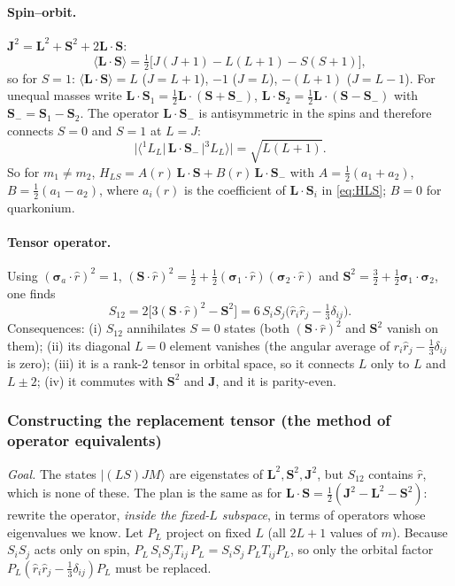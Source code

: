 \documentclass[11pt,a4paper]{article}
\numberwithin{equation}{section}
\theoremstyle{definition}
\theoremstyle{plain}
\theoremstyle{remark}
\numberwithin{algorithm}{section}
\newcommand{\vL}{\bm L}
\newcommand{\vS}{\bm S}
\newcommand{\vJ}{\bm J}
\newcommand{\vsig}{\bm\sigma}
\newcommand{\ket}[1]{|#1\rangle}
\begin{document}
\paragraph{Spin--orbit.} $\vJ^2=\vL^2+\vS^2+2\vL\!\cdot\!\vS$:
\begin{equation}
\langle\vL\!\cdot\!\vS\rangle=\tfrac12\big[J(J+1)-L(L+1)-S(S+1)\big],
\end{equation}
so for $S=1$: $\langle\vL\!\cdot\!\vS\rangle=L$ ($J=L+1$), $-1$ ($J=L$), $-(L+1)$ ($J=L-1$).
For unequal masses write $\vL\!\cdot\!\vS_1=\tfrac12\vL\!\cdot\!(\vS+\vS_-)$, $\vL\!\cdot\!\vS_2=\tfrac12\vL\!\cdot\!(\vS-\vS_-)$ with $\vS_-=\vS_1-\vS_2$. The operator $\vL\!\cdot\!\vS_-$ is antisymmetric in the spins and therefore connects $S=0$ and $S=1$ at $L=J$:
\begin{equation}
\big|\langle{}^1L_L|\,\vL\!\cdot\!\vS_-\,|{}^3L_L\rangle\big|=\sqrt{L(L+1)} .
\end{equation}
So for $m_1\neq m_2$, $H_{LS}=A(r)\,\vL\!\cdot\!\vS+B(r)\,\vL\!\cdot\!\vS_-$ with $A=\tfrac12(a_1+a_2)$, $B=\tfrac12(a_1-a_2)$, where $a_i(r)$ is the coefficient of $\vL\!\cdot\!\vS_i$ in \eqref{eq:HLS}; $B=0$ for quarkonium.

\paragraph{Tensor operator.} Using $(\vsig_a\!\cdot\!\hat r)^2=1$, $(\vS\cdot\hat r)^2=\frac12+\frac12(\vsig_1\cdot\hat r)(\vsig_2\cdot\hat r)$ and $\vS^2=\frac32+\frac12\vsig_1\cdot\vsig_2$, one finds
\begin{equation}
S_{12}=2\big[3(\vS\!\cdot\!\hat r)^2-\vS^2\big]=6\,S_iS_j\Big(\hat r_i\hat r_j-\tfrac13\delta_{ij}\Big).
\label{eq:S12S}
\end{equation}
Consequences: (i) $S_{12}$ annihilates $S=0$ states (both $(\vS\cdot\hat r)^2$ and $\vS^2$ vanish on them); (ii) its diagonal $L=0$ element vanishes (the angular average of $\hat r_i\hat r_j-\frac13\delta_{ij}$ is zero); (iii) it is a rank-2 tensor in orbital space, so it connects $L$ only to $L$ and $L\pm2$; (iv) it commutes with $\vS^2$ and $\vJ$, and it is parity-even.

\subsubsection{Constructing the replacement tensor (the method of operator equivalents)}\label{sec:stevens}
\emph{Goal.} The states $\ket{(LS)JM}$ are eigenstates of $\vL^2,\vS^2,\vJ^2$, but $S_{12}$ contains $\hat r$, which is none of these. The plan is the same as for $\vL\cdot\vS=\frac12(\vJ^2-\vL^2-\vS^2)$: rewrite the operator, \emph{inside the fixed-$L$ subspace}, in terms of operators whose eigenvalues we know. Let $P_L$ project on fixed $L$ (all $2L+1$ values of $m$). Because $S_iS_j$ acts only on spin, $P_L\,S_iS_jT_{ij}\,P_L=S_iS_j\,P_LT_{ij}P_L$, so only the orbital factor $P_L(\hat r_i\hat r_j-\frac13\delta_{ij})P_L$ must be replaced.
\end{document}
